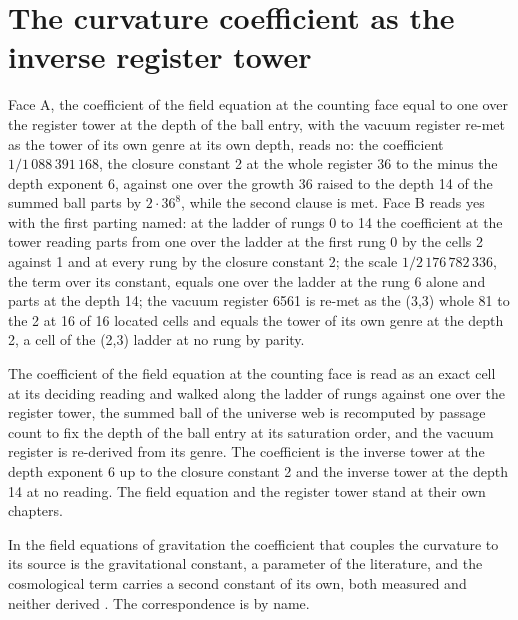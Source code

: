 \section{The curvature coefficient as the inverse register tower}\label{mod:X-1-D541211-w-cvcf}
\begin{chwall}\label{box:X-1-D541211-w-cvcf:1}
Face A, the coefficient of the field equation at the counting face equal to one over the register tower at the depth of the ball entry, with the vacuum register re-met as the tower of its own genre at its own depth, reads no: the coefficient $1/1\,088\,391\,168$, the closure constant 2 at the whole register 36 to the minus the depth exponent 6, against one over the growth 36 raised to the depth 14 of the summed ball parts by $2\cdot 36^{8}$, while the second clause is met. Face B reads yes with the first parting named: at the ladder of rungs 0 to 14 the coefficient at the tower reading parts from one over the ladder at the first rung 0 by the cells 2 against 1 and at every rung by the closure constant 2; the scale $1/2\,176\,782\,336$, the term over its constant, equals one over the ladder at the rung 6 alone and parts at the depth 14; the vacuum register 6561 is re-met as the (3,3) whole 81 to the 2 at 16 of 16 located cells and equals the tower of its own genre at the depth 2, a cell of the (2,3) ladder at no rung by parity.
\end{chwall}
The coefficient of the field equation at the counting face is read as an exact cell at its deciding reading and walked along the ladder of rungs against one over the register tower, the summed ball of the universe web is recomputed by passage count to fix the depth of the ball entry at its saturation order, and the vacuum register is re-derived from its genre. The coefficient is the inverse tower at the depth exponent 6 up to the closure constant 2 and the inverse tower at the depth 14 at no reading. The field equation and the register tower stand at their own chapters.
\begin{chbridge}
In the field equations of gravitation the coefficient that couples the curvature to its source is the gravitational constant, a parameter of the literature, and the cosmological term carries a second constant of its own, both measured and neither derived \cite{Einstein1916,Einstein1917}. The correspondence is by name.
\end{chbridge}
